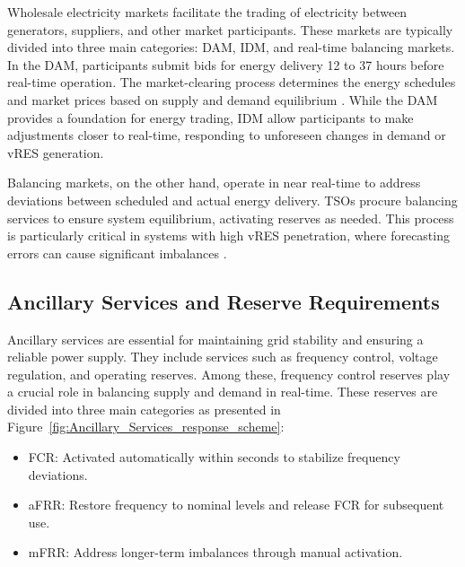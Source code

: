 Wholesale electricity markets facilitate the trading of electricity between generators, suppliers, and other market participants. These markets are typically divided into three main categories: \gls{DAM}, \gls{IDM}, and real-time balancing markets. In the \gls{DAM}, participants submit bids for energy delivery 12 to 37 hours before real-time operation. The market-clearing process determines the energy schedules and market prices based on supply and demand equilibrium \cite{Algarvio:19b}. While the \gls{DAM} provides a foundation for energy trading, \gls{IDM} allow participants to make adjustments closer to real-time, responding to unforeseen changes in demand or \gls{vRES} generation.\par

Balancing markets, on the other hand, operate in near real-time to address deviations between scheduled and actual energy delivery. \gls{TSO}s procure balancing services to ensure system equilibrium, activating reserves as needed. This process is particularly critical in systems with high \gls{vRES} penetration, where forecasting errors can cause significant imbalances \cite{Algarvio:19a}.\par

\subsection{Ancillary Services and Reserve Requirements}

Ancillary services are essential for maintaining grid stability and ensuring a reliable power supply. They include services such as frequency control, voltage regulation, and operating reserves. Among these, frequency control reserves play a crucial role in balancing supply and demand in real-time. These reserves are divided into three main categories \cite{Algarvio:19a} as presented in Figure~\ref{fig:Ancillary_Services_response_scheme}:

\begin{itemize}
    \item	\gls{FCR}: Activated automatically within seconds to stabilize frequency deviations.
    \item	\gls{aFRR}: Restore frequency to nominal levels and release FCR for subsequent use.
    \item	\gls{mFRR}: Address longer-term imbalances through manual activation.
\end{itemize}



